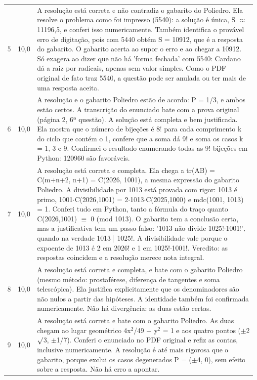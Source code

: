 \documentclass{article}%
\begin{document}
\begin{longtable}{@{}c c p{}@{}}
5 & 10,0 & A resolução está correta e não contradiz o gabarito do Poliedro. Ela resolve o problema como foi impresso (5540): a solução é única, S $\approx$ 11196,5, e conferi isso numericamente. Também identifica o provável erro de digitação, pois com 5440 obtém S = 10912, que é a resposta do gabarito. O gabarito acerta ao supor o erro e ao chegar a 10912. Só exagera ao dizer que não há 'forma fechada' com 5540: Cardano dá a raiz por radicais, apenas sem valor simples. Como o PDF original de fato traz 5540, a questão pode ser anulada ou ter mais de uma resposta aceita. \\
6 & 10,0 & A resolução e o gabarito Poliedro estão de acordo: P = 1/3, e ambos estão certos. A transcrição do enunciado bate com a prova original (página 2, 6ª questão). A solução está completa e bem justificada. Ela mostra que o número de bijeções é 8! para cada comprimento k do ciclo que contém o 1, confere que a soma dá 9! e soma os casos k = 1, 3 e 9. Confirmei o resultado enumerando todas as 9! bijeções em Python: 120960 são favoráveis. \\
7 & 10,0 & A resolução está correta e completa. Ela chega a tr(AB) = C(m+n+2, n+1) = C(2026, 1001), a mesma expressão do gabarito Poliedro. A divisibilidade por 1013 está provada com rigor: 1013 é primo, 1001$\cdot$C(2026,1001) = 2$\cdot$1013$\cdot$C(2025,1000) e mdc(1001, 1013) = 1. Conferi tudo em Python, tanto a fórmula do traço quanto C(2026,1001) $\equiv$ 0 (mod 1013). O gabarito tem a conclusão certa, mas a justificativa tem um passo falso: '1013 não divide 1025!$\cdot$1001!', quando na verdade 1013 | 1025!. A divisibilidade vale porque o expoente de 1013 é 2 em 2026! e 1 em 1025!$\cdot$1001!. Veredito: as respostas coincidem e a resolução merece nota integral. \\
8 & 10,0 & A resolução está correta e completa, e bate com o gabarito Poliedro (mesmo método: prostaférese, diferença de tangentes e soma telescópica). Ela justifica explicitamente que os denominadores são não nulos a partir das hipóteses. A identidade também foi confirmada numericamente. Não há divergência: as duas estão certas. \\
9 & 10,0 & A resolução está correta e bate com o gabarito Poliedro. As duas chegam ao lugar geométrico 4x$^2$/49 + y$^2$ = 1 e aos quatro pontos ($\pm$2$\surd$3, $\pm$1/7). Conferi o enunciado no PDF original e refiz as contas, inclusive numericamente. A resolução é até mais rigorosa que o gabarito, porque exclui os casos degenerados P = ($\pm$4, 0), sem efeito sobre a resposta. Não há erro a apontar. \\

\end{longtable}
\end{document}
